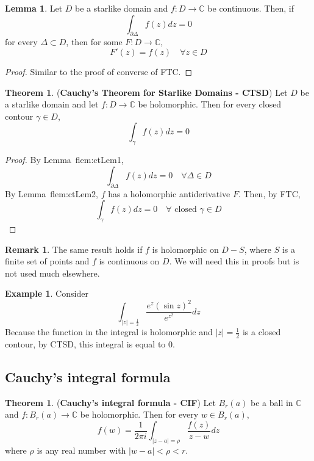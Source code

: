 \documentclass[12pt,a4paper]{article}
\theoremstyle{definition}
\newtheorem{theorem}[definition]{Theorem}
\newtheorem{lemma}[definition]{Lemma}
\newtheorem{example}[definition]{Example}
\newtheorem*{remark}{Remark}
\begin{document}
\begin{lemma}\label{lem:ctLem2}
	Let $D$ be a starlike domain and $f: D \rightarrow \mathbb{C}$ be continuous. Then, if
	\[
		\int_{\partial \Delta} f(z) dz = 0
	\]
	for every $\Delta \subset D$, then for some $F: D \rightarrow \mathbb{C}$,
	\[
		F'(z) = f(z) \quad \forall z \in D
	\]
\end{lemma}

\begin{proof}
	Similar to the proof of converse of FTC.
\end{proof}

\begin{theorem}
	(\textbf{Cauchy's Theorem for Starlike Domains - CTSD}) Let $D$ be a starlike domain and let $f: D \rightarrow \mathbb{C}$ be holomorphic. Then for every closed contour $\gamma \in D$,
	\[
		\int_{\gamma} f(z) dz = 0
	\]
\end{theorem}

\begin{proof}
	By Lemma~f{lem:ctLem1},
	\[
		\int_{\partial \Delta} f(z) dz = 0 \quad \forall \Delta \in D
	\]
	By Lemma~f{lem:ctLem2}, $f$ has a holomorphic antiderivative $F$. Then, by FTC,
	\[
		\int_{\gamma} f(z) dz = 0 \quad \forall \text{ closed } \gamma \in D
	\]
\end{proof}

\begin{remark}
	The same result holds if $f$ is holomorphic on $D - S$, where $S$ is a finite set of points and $f$ is continuous on $D$. We will need this in proofs but is not used much elsewhere.
\end{remark}

\begin{example}
	Consider
	\[
		\int_{|z| = \frac{1}{2}} \frac{e^z {(\sin z)}^2}{e^{z^2}} dz
	\]
	Because the function in the integral is holomorphic and $|z| = \frac{1}{2}$ is a closed contour, by CTSD, this integral is equal to $0$.
\end{example}

\subsection{Cauchy's integral formula}

\begin{theorem}
	(\textbf{Cauchy's integral formula - CIF}) Let $B_r(a)$ be a ball in $\mathbb{C}$ and $f: B_r(a) \rightarrow \mathbb{C}$ be holomorphic. Then for every $w \in B_r(a)$,
	\[
		f(w) = \frac{1}{2 \pi i} \int_{|z - a| = \rho} \frac{f(z)}{z - w} dz
	\]
	where $\rho$ is any real number with $|w - a| < \rho < r$.
\end{theorem}
\end{document}
